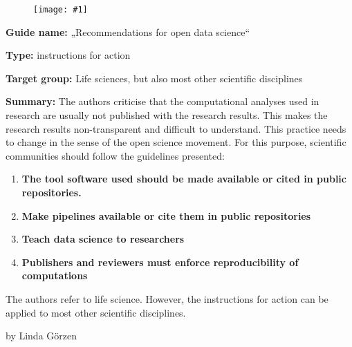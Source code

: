 \documentclass{article}
\newlength{\imgwidth}
\newcommand\scaledgraphics[2]{%
                
\settowidth{\imgwidth}{\texttt{[image: \#1]}}%
                
\setlength{\imgwidth}{\minof{\imgwidth}{#2\textwidth}}%
                
\texttt{[image: \#1]}%
                
}
\begin{document}
\begin{figure}
\scaledgraphics{10e3bc75-5c14-48e3-a161-d685105f455b.png}{1}
\label{F57414871}
\end{figure}





\textbf{Guide name:} „Recommendations for open data science“ \autocite{gymrek_recommendations_2016}


\textbf{Type:} instructions for action


\textbf{Target group:} Life sciences, but also most other scientific disciplines


\textbf{Summary: }The authors criticise that the computational analyses used in research are usually not published with the research results. This makes the research results non-transparent and difficult to understand. This practice needs to change in the sense of the open science movement. For this purpose, scientific communities should follow the guidelines presented:

\begin{enumerate}
\item \textbf{The tool software used should be made available or cited in public repositories.}


\item \textbf{Make pipelines available or cite them in public repositories}


\item \textbf{Teach data science to researchers}


\item \textbf{Publishers and reviewers must enforce reproducibility of computations}


\end{enumerate}

The authors refer to life science. However, the instructions for action can be applied to most other scientific disciplines.





by Linda Görzen





\printbibliography[title={Bibliography}]
\end{document}
